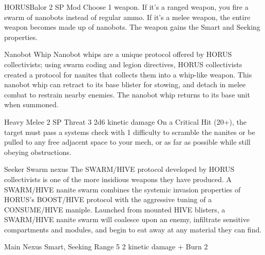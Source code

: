 \begin{mech}{HORUS}{Balor}
2 SP
Mod
Choose 1 weapon. If it's a ranged weapon, you fire a swarm of nanobots instead of regular ammo. If it's a melee weapon, the entire weapon becomes made up of nanobots. The weapon gains the Smart and Seeking properties.

Nanobot Whip
Nanobot whips are a unique protocol offered by HORUS collectivists; using swarm coding and legion directives, HORUS collectivists created a protocol for nanites that collects them into a whip-like weapon. This nanobot whip can retract to its base blister for stowing, and detach in melee combat to restrain nearby enemies. The nanobot whip returns to its base unit when summoned.

Heavy Melee
2 SP
Threat 3
2d6 kinetic damage
On a Critical Hit (20+), the target must pass a systems check with 1 difficulty to scramble the nanites or be pulled to any free adjacent space to your mech, or as far as possible while still obeying obstructions.

Seeker Swarm nexus
The SWARM/HIVE protocol developed by HORUS collectivists is one of the more insidious weapons they have produced. A SWARM/HIVE nanite swarm combines the systemic invasion properties of HORUS's BOOST/HIVE protocol with the aggressive tuning of a CONSUME/HIVE maniple. Launched from mounted HIVE blisters, a SWARM/HIVE nanite swarm will coalesce upon an enemy, infiltrate sensitive compartments and modules, and begin to eat away at any material they can find.

Main Nexus
Smart, Seeking
Range 5
2 kinetic damage + Burn 2


\end{mech}
